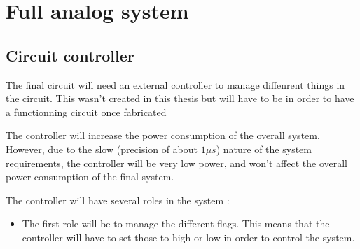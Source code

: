 \section{Full analog system}\label{sec:fullsys}

\subsection{Circuit controller}%

The final circuit will need an external controller to manage diffenrent things in the circuit. This wasn't created in this thesis but will have to be in order to have a functionning circuit once fabricated %

The controller will increase the power consumption of the overall system. However, due to the slow (precision of about $1\mu s$) nature of the system requirements, the controller will be very low power, and won't affect the overall power consumption of the final system.

The controller will have several roles in the system :
\begin{itemize}
\item The first role will be to manage the different flags. This means that the controller will have to set those to high or low in order to control the system.
\end{itemize}

